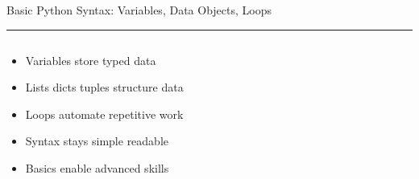 \documentclass[aspectratio=169]{beamer}
\newcommand{\TitleFont}{\rmfamily}
\begin{document}
\begin{frame}[t]{}
  \vspace*{0.5cm}
  {\TitleFont\fontsize{18}{22}\selectfont\color{LUBronze}Basic Python Syntax: Variables, Data Objects, Loops\par}
  \vspace{0.3em}
  {\color{LUBronze}\rule{\linewidth}{0.8pt}}\par
  \vspace{0.2cm}
  \begin{columns}[t]
    \begin{column}[t]{0.4\textwidth}
      \vspace*{0pt}
      \begin{itemize}\setlength\itemsep{0.65em}
        \item Variables store typed data
        \item Lists dicts tuples structure data
        \item Loops automate repetitive work
        \item Syntax stays simple readable
        \item Basics enable advanced skills
      \end{itemize}
    \end{column}
  \end{columns}
\end{frame}
\end{document}
